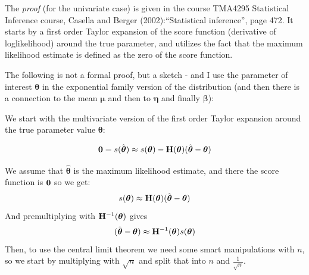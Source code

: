 \documentclass[
  ignorenonframetext,
]{beamer}
\begin{document}
\begin{frame}
The \emph{proof} (for the univariate case) is given in the course
TMA4295 Statistical Inference course, Casella and Berger
(2002):``Statistical inference'', page 472. It starts by a first order
Taylor expansion of the score function (derivative of loglikelihood)
around the true parameter, and utilizes the fact that the maximum
likelihood estimate is defined as the zero of the score function.
\end{frame}

\begin{frame}
The following is not a formal proof, but a sketch - and I use the
parameter of interest \(\boldsymbol{\theta}\) in the exponential family
version of the distribution (and then there is a connection to the mean
\(\boldsymbol{\mu}\) and then to \(\boldsymbol{\eta}\) and finally
\(\boldsymbol{\beta}\)):

We start with the multivariate version of the first order Taylor
expansion around the true parameter value \(\boldsymbol{\theta}\):

\[{\bf 0}=s(\hat{\boldsymbol{\theta}})\approx s({\boldsymbol{\theta}})-{\bf H}({\boldsymbol{\theta}})(\hat{\boldsymbol{\theta}}-{\boldsymbol{\theta}})\]

We assume that \(\hat{\boldsymbol{\theta}}\) is the maximum likelihood
estimate, and there the score function is \({\bf 0}\) so we get:
\[s({\boldsymbol{\theta}})\approx {\bf H}({\boldsymbol{\theta}})(\hat{\boldsymbol{\theta}}-{\boldsymbol{\theta}})\]
And premultiplying with \({\bf H}^{-1}(\boldsymbol{\theta})\) gives
\[ (\hat{\boldsymbol{\theta}}-{\boldsymbol{\theta}})\approx {\bf H}^{-1}({\boldsymbol{\theta}})s({\boldsymbol{\theta}})\]
Then, to use the central limit theorem we need some smart manipulations
with \(n\), so we start by multiplying with \(\sqrt{n}\) and split that
into \(n\) and \(\frac{1}{\sqrt{n}}\).
\end{frame}
\end{document}
